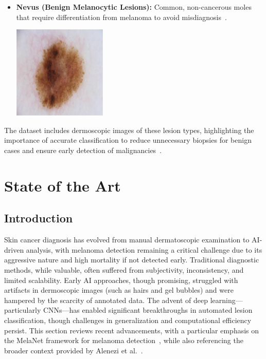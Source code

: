 \documentclass[a4paper,12pt]{report}
\begin{document}
\begin{spacing}{1.5}
\begin{itemize}
        \item \textbf{Nevus (Benign Melanocytic Lesions):} Common, non-cancerous moles that require differentiation from melanoma to avoid misdiagnosis~\cite{dl14,dl15}.
        
        \begin{center}
            \includegraphics[width=0.35\textwidth]{Pics/cancer/nevus.jpg}
        \end{center}
    \end{itemize}
    The dataset includes dermoscopic images of these lesion types, highlighting the importance of accurate classification to reduce unnecessary biopsies for benign cases and ensure early detection of malignancies~\cite{dl15}.

\newpage


\chapter{State of the Art}

    \section{Introduction}
    
    Skin cancer diagnosis has evolved from manual dermatoscopic examination to AI-driven analysis, with melanoma detection remaining a critical challenge due to its aggressive nature and high mortality if not detected early. Traditional diagnostic methods, while valuable, often suffered from subjectivity, inconsistency, and limited scalability. Early AI approaches, though promising, struggled with artifacts in dermoscopic images (such as hairs and gel bubbles) and were hampered by the scarcity of annotated data. The advent of deep learning—particularly CNNs—has enabled significant breakthroughs in automated lesion classification, though challenges in generalization and computational efficiency persist. This section reviews recent advancements, with a particular emphasis on the MelaNet framework for melanoma detection~\cite{lafraxo2022melanet}, while also referencing the broader context provided by Alenezi et al.~\cite{elgendi2023diagnostics}.
    

\end{spacing}
\end{document}
